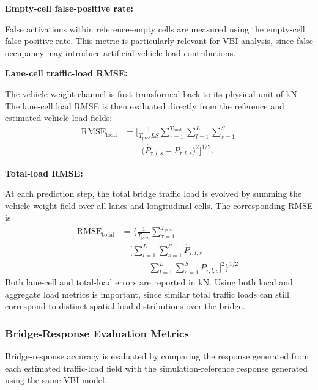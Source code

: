 \documentclass[journal]{IEEEtran}
\begin{document}
\textbf{Empty-cell false-positive rate:}

False activations within reference-empty cells are measured using the empty-cell false-positive rate. This metric is particularly relevant for VBI analysis, since false occupancy may introduce artificial vehicle-load contributions.

\textbf{Lane-cell traffic-load RMSE:}

The vehicle-weight channel is first transformed back to its physical unit of kN. The lane-cell load RMSE is then evaluated directly from the reference and estimated vehicle-load fields:
\begin{equation}
\begin{aligned}
\mathrm{RMSE}_{\mathrm{load}}&=\Biggl[\frac{1}{T_{\mathrm{pred}}LS}\sum_{\tau=1}^{T_{\mathrm{pred}}}\sum_{l=1}^{L}\sum_{s=1}^{S}\\
&\qquad\bigl(\widehat{P}_{\tau,l,s}-P_{\tau,l,s}\bigr)^2\Biggr]^{1/2}.
\end{aligned}
\end{equation}

\textbf{Total-load RMSE:}

At each prediction step, the total bridge traffic load is evolved by summing the vehicle-weight field over all lanes and longitudinal cells. The corresponding RMSE is
\begin{equation}
\begin{aligned}
\mathrm{RMSE}_{\mathrm{total}}&=\Biggl\{\frac{1}{T_{\mathrm{pred}}}\sum_{\tau=1}^{T_{\mathrm{pred}}}\\
&\quad\Biggl[\sum_{l=1}^{L}\sum_{s=1}^{S}\widehat{P}_{\tau,l,s}\\
&\qquad-\sum_{l=1}^{L}\sum_{s=1}^{S}P_{\tau,l,s}\Biggr]^2\Biggr\}^{1/2}.
\end{aligned}
\end{equation}
Both lane-cell and total-load errors are reported in kN. Using both local and aggregate load metrics is important, since similar total traffic loads can still correspond to distinct spatial load distributions over the bridge.

\subsubsection{Bridge-Response Evaluation Metrics}

Bridge-response accuracy is evaluated by comparing the response generated from each estimated traffic-load field with the simulation-reference response generated using the same VBI model.
\end{document}
